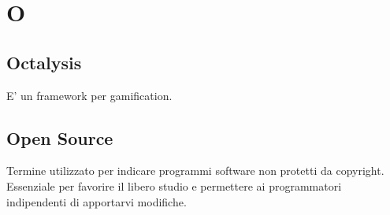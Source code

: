 \section*{O}

\subsection{Octalysis}
E' un framework per gamification.

\subsection{Open Source}
Termine utilizzato per indicare programmi software non protetti da copyright. Essenziale per favorire il libero studio e permettere ai programmatori indipendenti di apportarvi modifiche.
